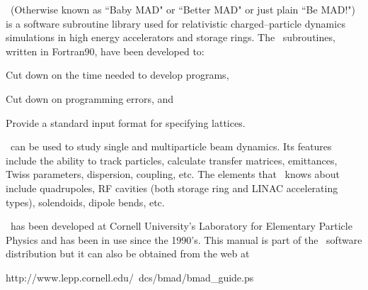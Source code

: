 
\bmad\ (Otherwise known as ``Baby MAD" or ``Better MAD" or just 
plain ``Be MAD!")  is a software subroutine library used for
relativistic charged--particle dynamics simulations in high energy
accelerators and storage rings. The \bmad\ subroutines, written in
Fortran90, have been developed to:
\begin{Itemize}
\item Cut down on the time needed to develop programs,
\item Cut down on programming errors, and
\item Provide a standard input format for specifying lattices.
\end{Itemize}

\bmad\ can be used to study single and multiparticle beam dynamics. Its 
features include the ability to track particles, calculate transfer matrices,
emittances, Twiss parameters, 
dispersion, coupling, etc. The elements that \bmad\ knows about include
quadrupoles, RF cavities (both storage ring and LINAC accelerating types),
solendoids, dipole bends, etc. 

\bmad\ has been developed at Cornell University's Laboratory for Elementary
Particle Physics and has been in use since the 1990's. This manual is part of the 
\bmad\ software distribution but it can also be obtained from the web at
\begin{example}
  http://www.lepp.cornell.edu/~dcs/bmad/bmad_guide.ps
\end{example}
\vfill
\break
